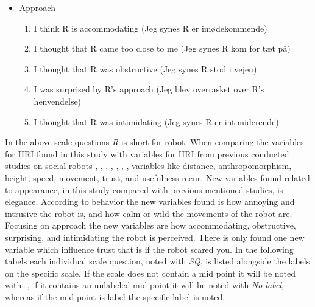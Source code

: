 \begin{itemize}
\begin{enumerate}
\end{enumerate}
\item Approach 
\begin{enumerate}
  \item I think R is accommodating (Jeg synes R er imødekommende)
  \item I thought that R came too close to me (Jeg synes R kom for tæt på)
  \item I thought that R was obstructive (Jeg synes R stod i vejen)
  \item I was surprised by R's approach (Jeg blev overrasket over R's henvendelse)
  \item I thought that R was intimidating (Jeg synes R er intimiderende)\\
\end{enumerate}
\end{itemize}
%
In the above scale questions \textit{R} is short for robot. When comparing the variables for HRI found in this study with variables for HRI from previous conducted studies on social robots \cite{PDF:ExploringInfluencingVariable}, \cite{PDF:SharingALifeHarvey}, \cite{PDF:InTheCompanyofRobots}, \cite{PDF:CloseButNotStuck}, \cite{PDF:TheImpactOfTraveler}, \cite{PDF:HumanRobotEmodiedInteraction}, \cite{PDF:RecommendationEffects}, variables like distance, anthropomorphism, height, speed, movement, trust, and usefulness recur. New variables found related to appearance, in this study compared with previous mentioned studies, is elegance. According to behavior the new variables found is how annoying and intrusive the robot is, and how calm or wild the movements of the robot are. Focusing on approach the new variables are how accommodating, obstructive, surprising, and intimidating the robot is perceived. There is only found one new variable which influence trust that is if the robot scared you. In the following tabels each individual scale question, noted with \textit{SQ}, is listed alongside the labels on the specific scale. If the scale does not contain a mid point it will be noted with \textit{-}, if it contains an unlabeled mid point it will be noted with \textit{No label}, whereas if the mid point is label the specific label is noted. 
%
